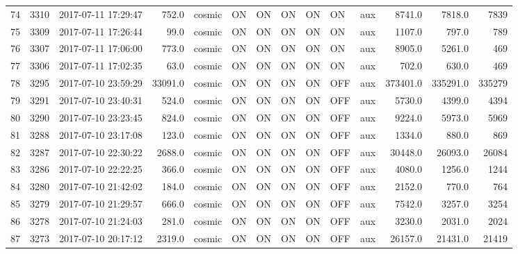 \begin{longtable}{lrlrlllllllrrr}
74  &  3310 &  2017-07-11 17:29:47 &     752.0 &   cosmic &  ON &   ON &   ON &  ON &   ON &       aux &      8741.0 &       7818.0 &                7839 \\
75  &  3309 &  2017-07-11 17:26:44 &      99.0 &   cosmic &  ON &   ON &   ON &  ON &   ON &       aux &      1107.0 &        797.0 &                 789 \\
76  &  3307 &  2017-07-11 17:06:00 &     773.0 &   cosmic &  ON &   ON &   ON &  ON &   ON &       aux &      8905.0 &       5261.0 &                 469 \\
77  &  3306 &  2017-07-11 17:02:35 &      63.0 &   cosmic &  ON &   ON &   ON &  ON &   ON &       aux &       702.0 &        630.0 &                 469 \\
78  &  3295 &  2017-07-10 23:59:29 &   33091.0 &   cosmic &  ON &   ON &   ON &  ON &  OFF &       aux &    373401.0 &     335291.0 &              335279 \\
79  &  3291 &  2017-07-10 23:40:31 &     524.0 &   cosmic &  ON &   ON &   ON &  ON &  OFF &       aux &      5730.0 &       4399.0 &                4394 \\
80  &  3290 &  2017-07-10 23:23:45 &     824.0 &   cosmic &  ON &   ON &   ON &  ON &  OFF &       aux &      9224.0 &       5973.0 &                5969 \\
81  &  3288 &  2017-07-10 23:17:08 &     123.0 &   cosmic &  ON &   ON &   ON &  ON &  OFF &       aux &      1334.0 &        880.0 &                 869 \\
82  &  3287 &  2017-07-10 22:30:22 &    2688.0 &   cosmic &  ON &   ON &   ON &  ON &  OFF &       aux &     30448.0 &      26093.0 &               26084 \\
83  &  3286 &  2017-07-10 22:22:25 &     366.0 &   cosmic &  ON &   ON &   ON &  ON &  OFF &       aux &      4080.0 &       1256.0 &                1244 \\
84  &  3280 &  2017-07-10 21:42:02 &     184.0 &   cosmic &  ON &   ON &   ON &  ON &  OFF &       aux &      2152.0 &        770.0 &                 764 \\
85  &  3279 &  2017-07-10 21:29:57 &     666.0 &   cosmic &  ON &   ON &   ON &  ON &  OFF &       aux &      7542.0 &       3257.0 &                3254 \\
86  &  3278 &  2017-07-10 21:24:03 &     281.0 &   cosmic &  ON &   ON &   ON &  ON &  OFF &       aux &      3230.0 &       2031.0 &                2024 \\
87  &  3273 &  2017-07-10 20:17:12 &    2319.0 &   cosmic &  ON &   ON &   ON &  ON &  OFF &       aux &     26157.0 &      21431.0 &               21419 \\

\end{longtable}
